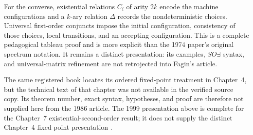 For the converse, existential relations \(C_i\) of arity \(2k\) encode the
machine configurations and a \(k\)-ary relation \(\Delta\) records the
nondeterministic choices.  Universal first-order conjuncts impose the initial
configuration, consistency of those choices, local transitions, and an
accepting configuration.  This is a complete pedagogical tableau proof and is
more explicit than the 1974 paper's original spectrum notation.  It remains a
distinct presentation: its examples, \(SO\exists\) syntax, and universal-matrix
refinement are not retrojected into Fagin's article.

The same registered book locates its ordered fixed-point treatment in
Chapter~4, but the technical text of that chapter was not available in the
verified source copy.  Its theorem number, exact syntax, hypotheses, and proof
are therefore not supplied here from the 1986 article.  The 1999 presentation
above is complete for the Chapter~7 existential-second-order result; it does
not supply the distinct Chapter~4 fixed-point presentation
\cite{Immerman1999}.
